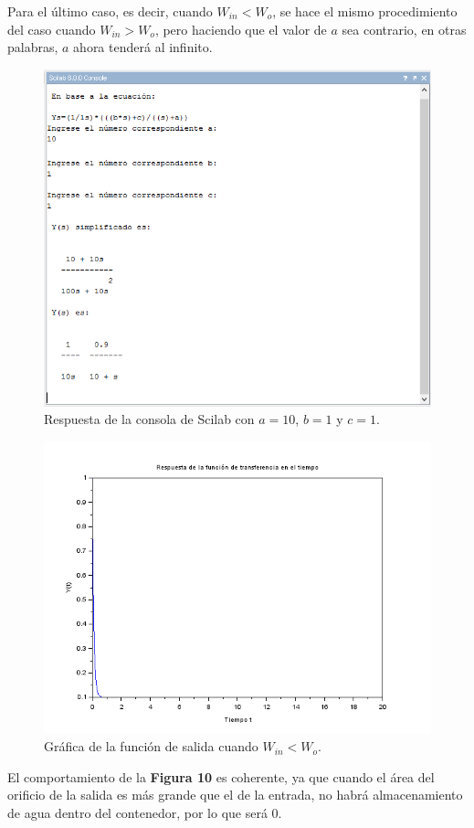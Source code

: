 \documentclass[letterpaper]{article}
\begin{document}
	Para el último caso, es decir, cuando $ W_{in}<W_o $, se hace el mismo procedimiento del caso cuando $ W_{in}>W_o $, pero haciendo que el valor de $ a $ sea contrario, en otras palabras, $ a $ ahora tenderá al infinito.
	\begin{figure}[h]
		\centering
		\includegraphics[scale=.5]{cod3}
		\caption{Respuesta de la consola de Scilab con $ a=10 $, $ b=1 $ y $ c=1 $.}
	\end{figure}
	\FloatBarrier
	\begin{figure}[h]
		\centering
		\includegraphics[scale=.65]{gra4}
		\caption{Gráfica de la función de salida cuando $ W_{in}<W_o $.}
	\end{figure}
	\FloatBarrier
	El comportamiento de la \textbf{Figura 10} es coherente, ya que cuando el área del orificio de la salida es más grande que el de la entrada, no habrá almacenamiento de agua dentro del contenedor, por lo que será $ 0 $.
		
\end{document}
